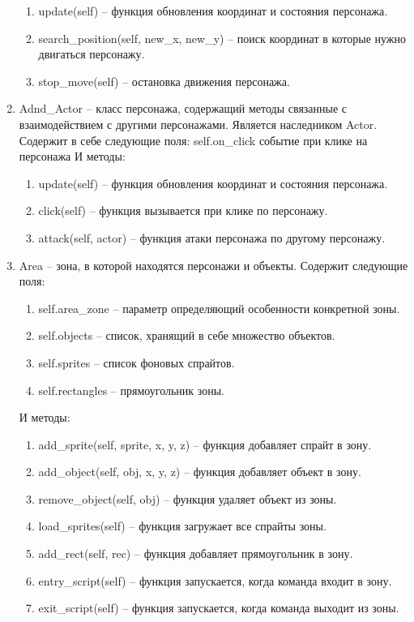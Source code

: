 \begin{enumerate}
\begin{enumerate}
			\item update(self) -- функция обновления координат и состояния персонажа.
			\item search\_position(self, new\_x, new\_y) -- поиск координат в которые нужно двигаться персонажу.
			\item stop\_move(self) -- остановка движения персонажа.
		\end{enumerate}
	\item Adnd\_Actor -- класс персонажа, содержащий методы связанные с взаимодействием с другими персонажами. Является наследником Actor. Содержит в себе следующие поля:
		self.on\_click событие при клике на персонажа
		И методы:
		\begin{enumerate}
			\item update(self) -- функция обновления координат и состояния персонажа.
			\item click(self) -- функция вызывается при клике по персонажу.
			\item attack(self, actor) --  функция атаки персонажа по другому персонажу.
		\end{enumerate}
	\item Area -- зона, в которой находятся персонажи и объекты. Содержит следующие поля:
		\begin{enumerate}
			\item self.area\_zone -- параметр определяющий особенности конкретной зоны.
			\item self.objects -- список, хранящий в себе множество объектов.
			\item self.sprites -- список фоновых спрайтов.
			\item self.rectangles -- прямоугольник зоны.
		\end{enumerate}
		И методы:
		\begin{enumerate}
			\item add\_sprite(self, sprite, x, y, z) -- функция добавляет спрайт в зону.
			\item add\_object(self, obj, x, y, z) -- функция добавляет объект в зону.
			\item remove\_object(self, obj) -- функция удаляет объект из зоны.
			\item load\_sprites(self) -- функция загружает все спрайты зоны.
			\item add\_rect(self, rec) -- функция добавляет прямоугольник в зону.
			\item entry\_script(self) -- функция запускается, когда команда входит в зону.
			\item exit\_script(self) -- функция запускается, когда команда выходит из зоны.

\end{enumerate}
\end{enumerate}
